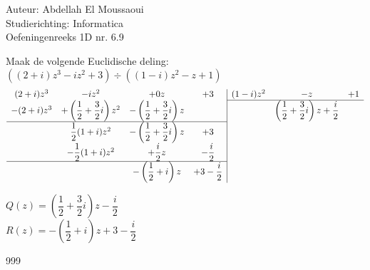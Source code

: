 \documentclass[a4paper]{article}
\begin{document}
  
\noindent \large Auteur: Abdellah El Moussaoui \\
\noindent \large Studierichting: Informatica\\
\noindent \large Oefeningenreeks 1D nr. 6.9\\

\medskip

\normalsize

Maak de volgende Euclidische deling: \\

$((2+i)z^3-iz^2+3) \div ((1-i)z^2-z+1)$\\


\[
\begin{array}{cccc|ccc}
(2+i)z^3 & -iz^2 & +0z & +3 & (1-i)z^2 & -z & +1 \\ \cline{5-7}

-(2+i)z^3
& +\left(\dfrac{1}{2}+\dfrac{3}{2} i\right)z^2
& -\left(\dfrac{1}{2}+\dfrac{3}{2} i\right)z
& 
& & \left(\dfrac{1}{2}+\dfrac{3}{2} i\right)z + \dfrac{i}{2} & \\ \cline{1-4}


& \dfrac12(1+i)z^2
& -\left(\dfrac12+\dfrac32 i\right)z
& +3
& & & \\


& -\dfrac12(1+i)z^2
& +\dfrac{i}{2}z
& -\dfrac{i}{2}
& &  & \\ \cline{1-4}

& 
& -\left(\dfrac12+i\right)z
& +3-\dfrac{i}{2}
& & &
\end{array}
\]


$Q(z) = \left(\dfrac{1}{2}+\dfrac{3}{2} i\right)z - \dfrac{i}{2}$\\

$R(z) = -\left(\dfrac12+i\right)z +3-\dfrac{i}{2} $\\

\begin{thebibliography}{999}
\end{thebibliography}
\end{document}

